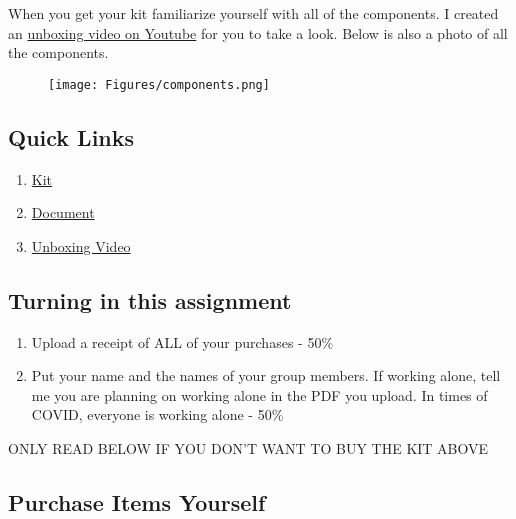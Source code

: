 \documentclass{article}
\begin{document}
When you get your kit familiarize yourself with all of the
components. I created an
\href{https://youtu.be/6sNNQrhnzLE}{unboxing video on Youtube} for you
to take a look. Below is also a photo of all the components.
\begin{figure}[H]
  \begin{center}
    \texttt{[image: Figures/components.png]}
  \end{center}
\end{figure}

\subsection{Quick Links}

\begin{enumerate}[itemsep=-5pt]
  \item \href{https://www.tangiblesthatteach.com/product-page/instrumentation-kit-for-me-316}{Kit}
  \item \href{https://a2279211-28c1-4f46-9477-0d3265900c7f.filesusr.com/ugd/2413aa_ca39175b0a514b838ec96893b90590eb.pdf}{Document}
  \item \href{https://youtu.be/6sNNQrhnzLE}{Unboxing Video}
\end{enumerate}

\subsection{Turning in this assignment}

\begin{enumerate}[itemsep=-5pt]
  \item Upload a receipt of ALL of your purchases - 50\%
  \item Put your name and the names of your group members. If working
    alone, tell me you are planning on working alone in the PDF you
    upload. In times of COVID, everyone is working alone - 50\%
\end{enumerate}

\newpage

\begin{center}\LARGE{ONLY READ BELOW IF YOU DON’T WANT TO BUY THE KIT
    ABOVE}\end{center}

\subsection{Purchase Items Yourself}
\end{document}
